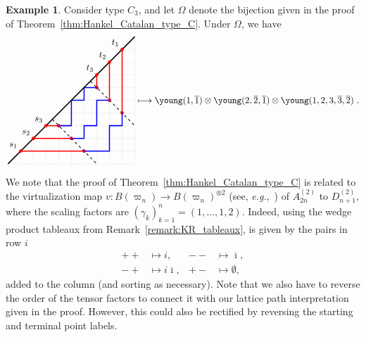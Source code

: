 \documentclass[11pt, leqno]{amsart}
\theoremstyle{plain}
\theoremstyle{definition}
\newtheorem{example}[theorem]{Example}
\numberwithin{equation}{section}
\newcommand{\fw}{\varpi} %
\newcommand{\othree}{\overline{3}}
\newcommand{\otwo}{\overline{2}}
\newcommand{\one}{\overline{1}}
\newcommand{\dyckgrid}[1]{
\foreach \i in {0, ..., #1} {\draw[gray!40, very thin] (\i,\i) -- (#1, \i); \draw[gray!40, very thin] (\i,\i) -- (\i, 0);}
}
\begin{document}
\begin{example}
Consider type $C_3$, and let $\Omega$ denote the bijection given in the proof of Theorem~\ref{thm:Hankel_Catalan_type_C}. Under $\Omega$, we have
\[
\begin{tikzpicture}[scale=0.5, baseline=68]
\dyckgrid{10}
\draw[very thick, blue, line join=round] (4,3) -- (5,3) -- (5, 5) -- (6,5) -- (6,6) -- (7,6) -- (6,6);
\draw[very thick, blue, line join=round] (5,2) -- (6,2) -- (6,3) -- (7,3) -- (7,5) -- (8,5) -- (8,5);
\draw[very thick, blue, line join=round] (6,1) -- (8,1) -- (8,3) -- (9,3) -- (9,4);
\draw[very thick,-] (0,0) -- (10,10);
\foreach \i in {1,2,3}
{
  \draw[very thick, red] (\i, \i) -- +(7-2*\i, 0);
  \draw[very thick, red] (10-\i, 10-\i) -- +(0, -7+2*\i);
}
\draw[thick,dashed] (3.5,3.5) -- +(3.5, -3.5);
\draw[thick,dashed] (6.5,6.5) -- +(3.5, -3.5);
\foreach \i in {1,2,3}
{
  \draw[fill=red, color=red] (\i, \i) circle (0.12);
  \draw (\i, \i) node[anchor=south east] {$s_{\i}$};
  \draw[fill=red, color=red] (10-\i, 10-\i) circle (0.12);
  \draw (10-\i, 10-\i) node[anchor=south east] {$t_{\i}$};
}
\foreach \i in {1,2,3}
{
  \draw[fill=purple, color=purple] (3+\i, 4-\i) circle (0.12);
  \draw[fill=purple, color=purple] (6+\i, 7-\i) circle (0.12);
}
\end{tikzpicture}
\longmapsto
\young(1,\one) \otimes \young(2,\otwo,\one) \otimes \young(1,2,3,\othree,\otwo) \ .
\]
\end{example}

We note that the proof of Theorem~\ref{thm:Hankel_Catalan_type_C} is related to the virtualization map $v \colon B(\fw_n) \to B(\fw_n)^{\otimes 2}$ (see, {\it e.g.},~\cite{K96,OSS03III,OSS03II,SchillingS15}) of $A_{2n}^{(2)}$ to $D_{n+1}^{(2)}$, where the scaling factors are $(\gamma_k)_{k=1}^n = (1, \dotsc, 1, 2)$. Indeed, using the wedge product tableaux from Remark~\ref{remark:KR_tableaux},
is given by the pairs in row $i$
\begin{align*}
++ & \longmapsto i, & -- & \longmapsto \overline{\imath}, \\
-+ & \longmapsto i\overline{\imath}, & +- & \longmapsto \emptyset,
\end{align*}
added to the column (and sorting as necessary).
Note that we also have to reverse the order of the tensor factors to connect it with our lattice path interpretation given in the proof. However, this could also be rectified by reversing the starting and terminal point labels.
\end{document}
